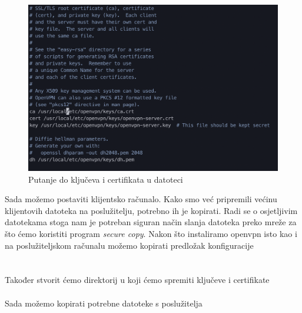         \begin{figure}[H]
            \centering
            \includegraphics[scale=0.57]{slike/serverPaths}
            \caption{Putanje do ključeva i certifikata u datoteci
            }
        \end{figure}
        
        Sada možemo postaviti klijentsko računalo. Kako smo već pripremili
        većinu klijentovih datoteka na poslužitelju, potrebno ih je kopirati.
        Radi se o osjetljivim datotekama stoga nam je potreban siguran način
        slanja datoteka preko mreže za što ćemo koristiti program
        \textit{secure copy}. Nakon što instaliramo openvpn isto kao i na
        poslužiteljskom računalu možemo kopirati predložak konfiguracije \\

        \noindent
         \\
         \\

        \noindent
        Također stvorit ćemo direktorij u koji ćemo spremiti ključeve i
        certifikate \\

        \noindent
        \\

        \noindent
        Sada možemo kopirati potrebne datoteke s poslužitelja \\

